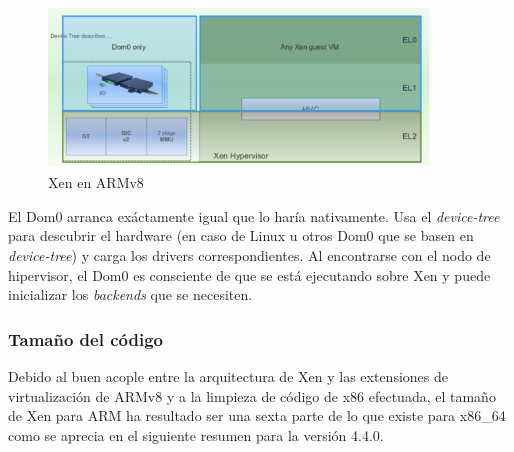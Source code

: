 \begin{figure}[!h]
  \centering
  \includegraphics[width=0.90\textwidth]{recursos/xen_3.png}
  \caption{Xen en ARMv8}
  \label{fig:xen_3}
\end{figure}

El Dom0 arranca exáctamente igual que lo haría nativamente. Usa el \textit{device-tree} para descubrir el hardware (en caso de Linux u otros Dom0 que se basen en \textit{device-tree}) y carga los drivers correspondientes. Al encontrarse con el nodo de hipervisor, el Dom0 es consciente de que se está ejecutando sobre Xen y puede inicializar los \textit{backends} que se necesiten.

\subsubsection{Tamaño del código}

Debido al buen acople entre la arquitectura de Xen y las extensiones de virtualización de ARMv8 y a la limpieza de código de x86 efectuada, el tamaño de Xen para ARM ha resultado ser una sexta parte de lo que existe para x86\_64 como se aprecia en el siguiente resumen para la versión 4.4.0.

